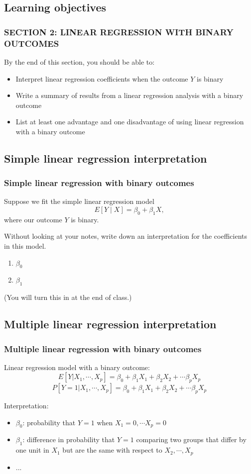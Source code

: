 \documentclass[12pt, 
hyperref={colorlinks=true, linkcolor=blue, urlcolor=cyan}]{beamer}
\begin{document}
\subsection{Learning objectives}
\begin{frame}
\frametitle{SECTION 2: LINEAR REGRESSION WITH BINARY OUTCOMES}

By the end of this section, you should be able to:
\begin{itemize}
\item Interpret linear regression coefficients when the outcome $Y$ is binary
\item Write a summary of results from a linear regression analysis with a binary outcome
\item List at least one advantage and one disadvantage of using linear regression with a binary outcome
\end{itemize}
\end{frame}

\subsection{Simple linear regression interpretation}
\begin{frame}
\frametitle{Simple linear regression with binary outcomes}
Suppose we fit the simple linear regression model $$E[Y \mid X] = \beta_0 + \beta_1 X,$$ where our outcome $Y$ is binary.

\color{orange} Without looking at your notes, \color{black} write down an interpretation for the coefficients in this model.

\begin{enumerate}
\item $\beta_0$
\item $\beta_1$
\end{enumerate} 

(You will turn this in at the end of class.)

\end{frame}

\subsection{Multiple linear regression interpretation}
\begin{frame}
\frametitle{Multiple linear regression with binary outcomes}
Linear regression model with a binary outcome: $$E[Y|X_1,\cdots,X_p] = \beta_0 + \beta_1 X_1 + \beta_2X_2 + \cdots \beta_p X_p$$ $$P[Y=1|X_1,\cdots,X_p] = \beta_0 + \beta_1 X_1 + \beta_2 X_2 + \cdots \beta_p X_p$$

\color{blue} Interpretation: \color{black}
\begin{itemize} 
\item $\beta_0$: \pause probability that $Y=1$ when $X_1 = 0, \cdots X_p = 0$
\item $\beta_1$: \pause difference in probability that $Y=1$ comparing two groups that differ by one unit in $X_1$ but are the same with respect to $X_2,\cdots,X_p$ 
\item ...
\end{itemize}
\end{frame}
\end{document}
